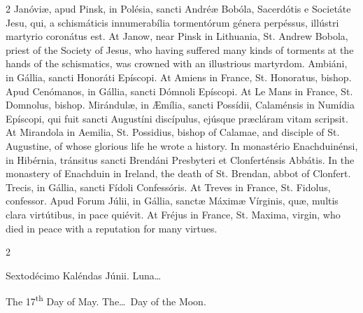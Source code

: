 \begin{paracol}{2}
\switchcolumn*
{}
Janóviæ, apud Pinsk, 
 in Polésia, sancti Andréæ Bobóla, Sacerdótis e Societáte Jesu, qui, a 
 schismáticis innumerabília tormentórum génera perpéssus, illústri martyrio 
 coronátus est.
\switchcolumn
{}
At Janow, near Pinsk in Lithuania, 
 St. Andrew Bobola, priest of the Society of Jesus, who having suffered many 
 kinds of torments at the hands of the schismatics, was crowned with an 
 illustrious martyrdom.
\switchcolumn*
{}
Ambiáni, in Gállia, 
 sancti Honoráti Epíscopi.
\switchcolumn
{}
At Amiens in France, St. Honoratus, 
 bishop.
\switchcolumn*
{}
Apud Cenómanos, in 
 Gállia, sancti Dómnoli Epíscopi.
\switchcolumn
{}
At Le Mans in France, St. Domnolus, 
 bishop.
\switchcolumn*
{}
Mirándulæ, in Æmília, 
 sancti Possídii, Calaménsis in Numídia Epíscopi, qui fuit sancti Augustíni 
 discípulus, ejúsque præcláram vitam scripsit.
\switchcolumn
{}
At Mirandola in Aemilia, St. 
 Possidius, bishop of Calamae, and disciple of St. Augustine, of whose 
 glorious life he wrote a history.
\switchcolumn*
{}
In monastério 
 Enachduinénsi, in Hibérnia, tránsitus sancti Brendáni Presbyteri et 
 Clonferténsis Abbátis.
\switchcolumn
{}
In the monastery of Enachduin in 
 Ireland, the death of St. Brendan, abbot of Clonfert.
\switchcolumn*
{}
Trecis, in Gállia, 
 sancti Fídoli Confessóris.
\switchcolumn
{}
At Treves in France, St. Fidolus, 
 confessor.
\switchcolumn*
{}
Apud Forum Júlii, in 
 Gállia, sanctæ Máximæ Vírginis, quæ, multis clara virtútibus, in pace 
 quiévit.
\switchcolumn
{}
At Fréjus in France, St. Maxima, 
 virgin, who died in peace with a reputation for many virtues.
\switchcolumn*
{}
\end{paracol}


\begin{paracol}{2}
\begin{center}{\color{gregoriocolor} Sextodécimo Kaléndas Júnii. 
 Luna\dots\ }\end{center}
\switchcolumn
{}
\begin{center}{\color{gregoriocolor} The 
 17\textsuperscript{th} Day of May. The\dots\ Day of the Moon.}\end{center}
\end{paracol}

